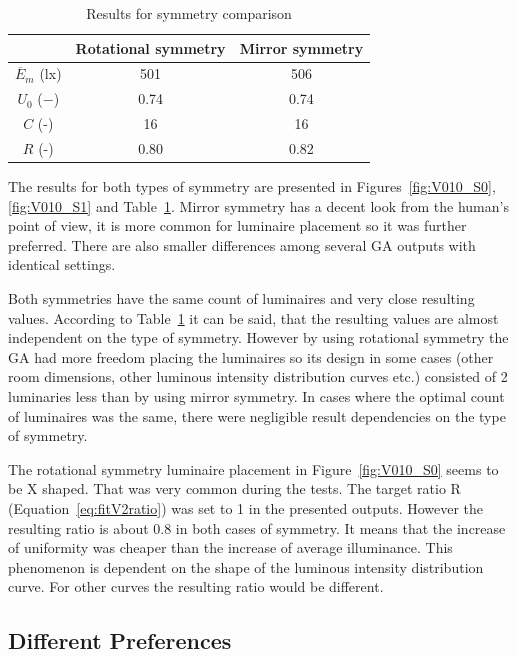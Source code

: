 \begin{table}[t]
	\renewcommand{\arraystretch}{1.3}
	\caption{Results for symmetry comparison}
 	\label{tab:symmetry}
	\centering
  \begin{tabular}{| c | c | c |}
    \hline
    & \textbf{Rotational symmetry} & \textbf{Mirror symmetry} \\
    \hline
    $\overline{E}_{m}$ (lx) & 501 & 506 \\
    \hline
		$U_0$ ($-$)& 0.74 & 0.74 \\
    \hline
		$C$ (-) & 16 & 16 \\
	\hline
		$R$ (-) & 0.80 & 0.82 \\
  \hline
  \end{tabular}
\end{table}

The results for both types of symmetry are presented in Figures~\ref{fig:V010_S0}, \ref{fig:V010_S1} and Table~\ref{tab:symmetry}. Mirror symmetry has a decent look from the human's point of view, it is more common for luminaire placement so it was further preferred. There are also smaller differences among several GA outputs with identical settings.

Both symmetries have the same count of luminaires and very close resulting values. According to Table~\ref{tab:symmetry} it can be said, that the resulting values are almost independent on the type of symmetry. However by using rotational symmetry the GA had more freedom placing the luminaires so its design in some cases (other room dimensions, other luminous intensity distribution curves etc.) consisted of 2 luminaries less than by using mirror symmetry. In cases where the optimal count of luminaires was the same, there were negligible result dependencies on the type of symmetry.

The rotational symmetry luminaire placement in Figure~\ref{fig:V010_S0} seems to be X shaped. That was very common during the tests. The target ratio R (Equation~\ref{eq:fitV2ratio}) was set to 1 in the presented outputs. However the resulting ratio is about 0.8 in both cases of symmetry. It means that the increase of uniformity was cheaper than the increase of average illuminance. This phenomenon is dependent on the shape of the luminous intensity distribution curve. For other curves the resulting ratio would be different.


\subsection{Different Preferences}

